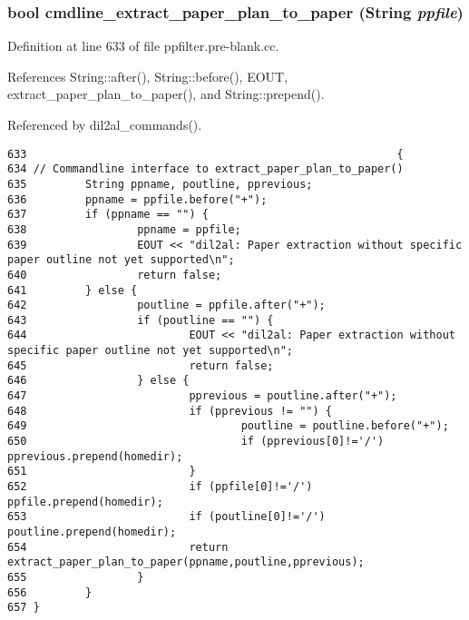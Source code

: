 \subsubsection{\setlength{\rightskip}{0pt plus 5cm}bool cmdline\_\-extract\_\-paper\_\-plan\_\-to\_\-paper ({\bf String} {\em ppfile})}\label{ppfilter_8pre-blank_8cc_a15}




Definition at line 633 of file ppfilter.pre-blank.cc.

References String::after(), String::before(), EOUT, extract\_\-paper\_\-plan\_\-to\_\-paper(), and String::prepend().

Referenced by dil2al\_\-commands().



\footnotesize\begin{verbatim}633                                                         {
634 // Commandline interface to extract_paper_plan_to_paper()
635         String ppname, poutline, pprevious;
636         ppname = ppfile.before("+");
637         if (ppname == "") {
638                 ppname = ppfile;
639                 EOUT << "dil2al: Paper extraction without specific paper outline not yet supported\n";
640                 return false;
641         } else {
642                 poutline = ppfile.after("+");
643                 if (poutline == "") {
644                         EOUT << "dil2al: Paper extraction without specific paper outline not yet supported\n";
645                         return false;
646                 } else {
647                         pprevious = poutline.after("+");
648                         if (pprevious != "") {
649                                 poutline = poutline.before("+");
650                                 if (pprevious[0]!='/') pprevious.prepend(homedir);
651                         }
652                         if (ppfile[0]!='/') ppfile.prepend(homedir);
653                         if (poutline[0]!='/') poutline.prepend(homedir);
654                         return extract_paper_plan_to_paper(ppname,poutline,pprevious);
655                 }
656         }
657 }
\end{verbatim}\normalsize 
{}
